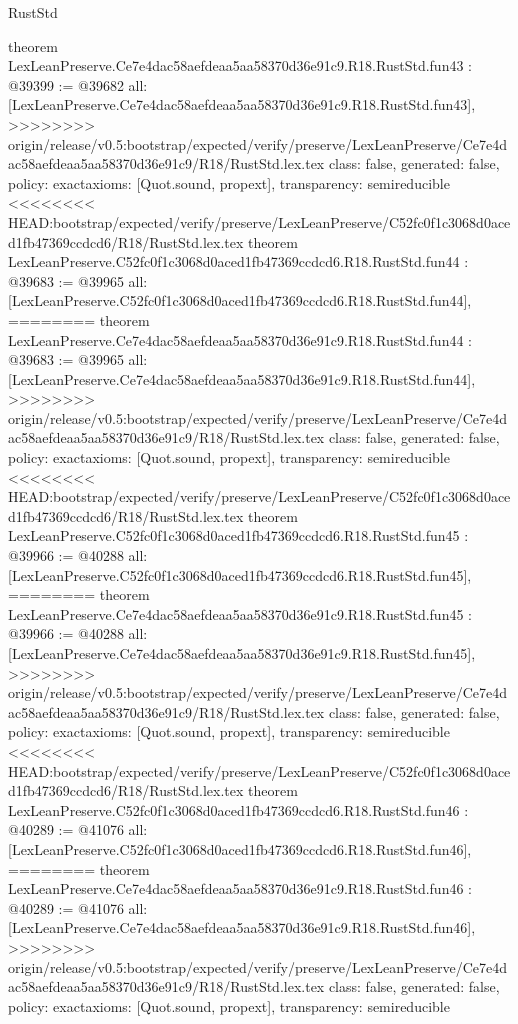 \begin{lexlean}{RustStd}
\begin{coremodule}
{\begin{coremodule}
{{{{{{{{{{{{{{{{{{{{{{{{{{{{{{{{{{{{{{{{{{{{{{theorem LexLeanPreserve.Ce7e4dac58aefdeaa5aa58370d36e91c9.R18.RustStd.fun43 : @39399 := @39682 {
  all: [LexLeanPreserve.Ce7e4dac58aefdeaa5aa58370d36e91c9.R18.RustStd.fun43],
>>>>>>>> origin/release/v0.5:bootstrap/expected/verify/preserve/LexLeanPreserve/Ce7e4dac58aefdeaa5aa58370d36e91c9/R18/RustStd.lex.tex
  class: false,
  generated: false,
  policy: exact{axioms: [Quot.sound, propext]},
  transparency: semireducible
}
<<<<<<<< HEAD:bootstrap/expected/verify/preserve/LexLeanPreserve/C52fc0f1c3068d0aced1fb47369ccdcd6/R18/RustStd.lex.tex
theorem LexLeanPreserve.C52fc0f1c3068d0aced1fb47369ccdcd6.R18.RustStd.fun44 : @39683 := @39965 {
  all: [LexLeanPreserve.C52fc0f1c3068d0aced1fb47369ccdcd6.R18.RustStd.fun44],
========
theorem LexLeanPreserve.Ce7e4dac58aefdeaa5aa58370d36e91c9.R18.RustStd.fun44 : @39683 := @39965 {
  all: [LexLeanPreserve.Ce7e4dac58aefdeaa5aa58370d36e91c9.R18.RustStd.fun44],
>>>>>>>> origin/release/v0.5:bootstrap/expected/verify/preserve/LexLeanPreserve/Ce7e4dac58aefdeaa5aa58370d36e91c9/R18/RustStd.lex.tex
  class: false,
  generated: false,
  policy: exact{axioms: [Quot.sound, propext]},
  transparency: semireducible
}
<<<<<<<< HEAD:bootstrap/expected/verify/preserve/LexLeanPreserve/C52fc0f1c3068d0aced1fb47369ccdcd6/R18/RustStd.lex.tex
theorem LexLeanPreserve.C52fc0f1c3068d0aced1fb47369ccdcd6.R18.RustStd.fun45 : @39966 := @40288 {
  all: [LexLeanPreserve.C52fc0f1c3068d0aced1fb47369ccdcd6.R18.RustStd.fun45],
========
theorem LexLeanPreserve.Ce7e4dac58aefdeaa5aa58370d36e91c9.R18.RustStd.fun45 : @39966 := @40288 {
  all: [LexLeanPreserve.Ce7e4dac58aefdeaa5aa58370d36e91c9.R18.RustStd.fun45],
>>>>>>>> origin/release/v0.5:bootstrap/expected/verify/preserve/LexLeanPreserve/Ce7e4dac58aefdeaa5aa58370d36e91c9/R18/RustStd.lex.tex
  class: false,
  generated: false,
  policy: exact{axioms: [Quot.sound, propext]},
  transparency: semireducible
}
<<<<<<<< HEAD:bootstrap/expected/verify/preserve/LexLeanPreserve/C52fc0f1c3068d0aced1fb47369ccdcd6/R18/RustStd.lex.tex
theorem LexLeanPreserve.C52fc0f1c3068d0aced1fb47369ccdcd6.R18.RustStd.fun46 : @40289 := @41076 {
  all: [LexLeanPreserve.C52fc0f1c3068d0aced1fb47369ccdcd6.R18.RustStd.fun46],
========
theorem LexLeanPreserve.Ce7e4dac58aefdeaa5aa58370d36e91c9.R18.RustStd.fun46 : @40289 := @41076 {
  all: [LexLeanPreserve.Ce7e4dac58aefdeaa5aa58370d36e91c9.R18.RustStd.fun46],
>>>>>>>> origin/release/v0.5:bootstrap/expected/verify/preserve/LexLeanPreserve/Ce7e4dac58aefdeaa5aa58370d36e91c9/R18/RustStd.lex.tex
  class: false,
  generated: false,
  policy: exact{axioms: [Quot.sound, propext]},
  transparency: semireducible
}}}}}}}}}}}}}}}}}}}}}}}}}}}}}}}}}}}}}}}}}}}}}}}}}}
\end{coremodule}}
\end{coremodule}
\end{lexlean}
